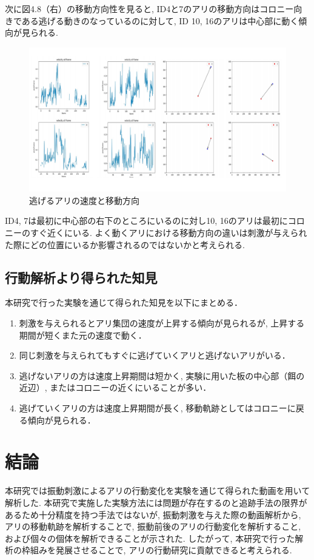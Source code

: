 ﻿\documentclass[a4paper, 12pt]{jsreport}
\begin{document}
次に図4.8（右）の移動方向性を見ると, ID4と7のアリの移動方向はコロニー向きである逃げる動きのなっているのに対して, ID 10, 16のアリは中心部に動く傾向が見られる. 
\begin{figure}[tbp]
\centering
\includegraphics[width=13cm,  keepaspectratio]{velo_hoko_nige.pdf}
\caption[Short figure caption for List of Figures]{逃げるアリの速度と移動方向}
\label{fig:paper1_fig15}
\end{figure}
ID4, 7は最初に中心部の右下のところにいるのに対し10, 16のアリは最初にコロニーのすぐ近くにいる. よく動くアリにおける移動方向の違いは刺激が与えられた際にどの位置にいるか影響されるのではないかと考えられる. 

\section{行動解析より得られた知見}
\label{sec:chiken}
本研究で行った実験を通じて得られた知見を以下にまとめる．
\begin{enumerate}
\item 刺激を与えられるとアリ集団の速度が上昇する傾向が見られるが, 上昇する期間が短くまた元の速度で動く．
\item 同じ刺激を与えられてもすぐに逃げていくアリと逃げないアリがいる．
\item 逃げないアリの方は速度上昇期間は短かく, 実験に用いた板の中心部（餌の近辺）, またはコロニーの近くにいることが多い．
\item 逃げていくアリの方は速度上昇期間が長く, 移動軌跡としてはコロニーに戻る傾向が見られる．
\end{enumerate}






\renewcommand{\arraystretch}{2}  %


\chapter{結論}
本研究では振動刺激によるアリの行動変化を実験を通じて得られた動画を用いて解析した. 本研究で実施した実験方法には問題が存在するのと追跡手法の限界があるため十分精度を持つ手法ではないが, 振動刺激を与えた際の動画解析から,  アリの移動軌跡を解析することで,  振動前後のアリの行動変化を解析すること,  および個々の個体を解析できることが示された. したがって,  本研究で行った解析の枠組みを発展させることで,  アリの行動研究に貢献できると考えられる. 
\end{document}
